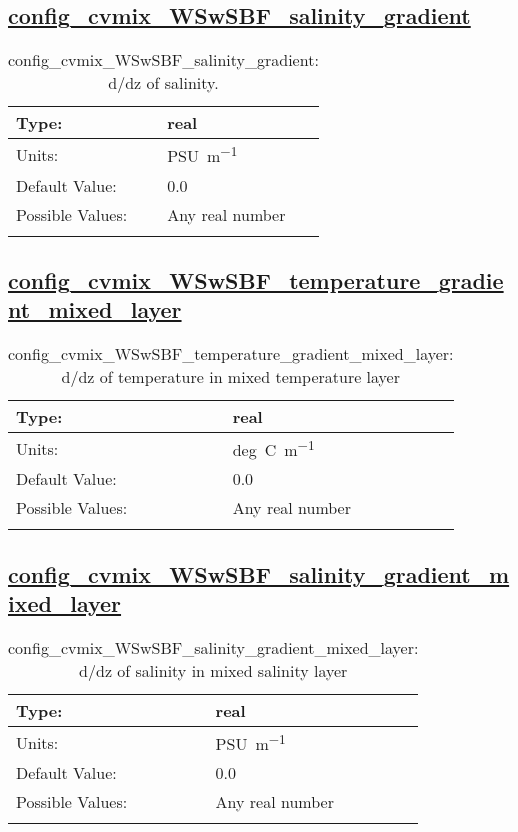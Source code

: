 \subsection[config\_cvmix\_WSwSBF\_salinity\_gradient]{\hyperref[sec:nm_tab_cvmix_WSwSBF]{config\_cvmix\_WSwSBF\_salinity\_gradient}}
\label{subsec:nm_sec_config_cvmix_WSwSBF_salinity_gradient}
\begin{center}
\begin{longtable}{| p{2.0in} || p{4.0in} |}
    \hline
    Type: & real \\
    \hline
    Units: & \si{PSU.m^{-1}} \\
    \hline
    Default Value: & 0.0 \\
    \hline
    Possible Values: & Any real number \\
    \hline
    \caption{config\_cvmix\_WSwSBF\_salinity\_gradient: d/dz of salinity.}
\end{longtable}
\end{center}
\subsection[config\_cvmix\_WSwSBF\_temperature\_gradient\_mixed\_layer]{\hyperref[sec:nm_tab_cvmix_WSwSBF]{config\_cvmix\_WSwSBF\_temperature\_gradient\_mixed\_layer}}
\label{subsec:nm_sec_config_cvmix_WSwSBF_temperature_gradient_mixed_layer}
\begin{center}
\begin{longtable}{| p{2.0in} || p{4.0in} |}
    \hline
    Type: & real \\
    \hline
    Units: & \si{deg.C.m^{-1}} \\
    \hline
    Default Value: & 0.0 \\
    \hline
    Possible Values: & Any real number \\
    \hline
    \caption{config\_cvmix\_WSwSBF\_temperature\_gradient\_mixed\_layer: d/dz of temperature in mixed temperature layer}
\end{longtable}
\end{center}
\subsection[config\_cvmix\_WSwSBF\_salinity\_gradient\_mixed\_layer]{\hyperref[sec:nm_tab_cvmix_WSwSBF]{config\_cvmix\_WSwSBF\_salinity\_gradient\_mixed\_layer}}
\label{subsec:nm_sec_config_cvmix_WSwSBF_salinity_gradient_mixed_layer}
\begin{center}
\begin{longtable}{| p{2.0in} || p{4.0in} |}
    \hline
    Type: & real \\
    \hline
    Units: & \si{PSU.m^{-1}} \\
    \hline
    Default Value: & 0.0 \\
    \hline
    Possible Values: & Any real number \\
    \hline
    \caption{config\_cvmix\_WSwSBF\_salinity\_gradient\_mixed\_layer: d/dz of salinity in mixed salinity layer}
\end{longtable}
\end{center}
